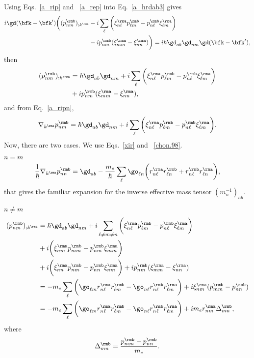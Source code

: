 Using Eqs.~\eqref{a_rip} and ~\eqref{a_rep}
into Eq.~\eqref{a_hrdab3} gives
\begin{align}\label{a_rapb}
i\gd(\bfk-\bfk')
\bigg(
(p^{\rmb}_{nm})_{;k^{\rma}}
&
-i
\sum_{\ell}
\bigg(
\xi^{\rma}_{n\ell}
p^{\rmb}_{\ell m}
-
p^{\rmb}_{n\ell}
\xi^{\rma}_{\ell m}
\bigg)
\nonumber \\
&
-i
p^{\rmb}_{nm}(\xi^{\rma}_{mm}
-
\xi^{\rma}_{nn}
)
\bigg)
=
i\hbar\gd_{ab}\gd_{nm}\gd(\bfk-\bfk')
,
\end{align}
then
\begin{align}\label{a_rapb2}
(p^{\rmb}_{nm})_{;k^{\rma}}&=
\hbar\gd_{ab}\gd_{nm}
+i
\sum_{\ell}
\bigg(
\xi^{\rma}_{n\ell}
p^{\rmb}_{\ell m}
-
p^{\rmb}_{n\ell}
\xi^{\rma}_{\ell m}
\bigg)
\nonumber \\
&+i
p^{\rmb}_{nm}(\xi^{\rma}_{mm}
-
\xi^{\rma}_{nn}
)
,
\end{align}
and from Eq.~\eqref{a_ripn},
\begin{align}\label{cogno}
\nabla_{k^{\rma}}p^{\rmb}_{nm}=
\hbar\gd_{ab}\gd_{nm}
+i
\sum_{\ell}
\bigg(
\xi^{\rma}_{n\ell}
p^{\rmb}_{\ell m}
-
p^{\rmb}_{n\ell}
\xi^{\rma}_{\ell m}
\bigg)
.
\end{align}
Now, there are two cases. We use Eqs.~\eqref{xir} and ~\eqref{chon.98}.

 $n=m$
\begin{align}\label{tita}
\frac{1}{\hbar}\nabla_{k^{\rma}}p^{\rmb}_{nn}=
\gd_{ab}
-\frac{m_e}{\hbar}
\sum_{\ell}
\go_{\ell n}
\bigg(
r^{\rma}_{n\ell}
r^{\rmb}_{\ell n}
+
r^{\rmb}_{n\ell}
r^{\rma}_{\ell n}
\bigg)
,
\end{align}
that gives the familiar expansion for the inverse effective mass
tensor $(m_n^{-1})_{ab}$.\cite{ashcroft_solid_1976}

 $n\ne m$
\begin{align}\label{mes}
(p^{\rmb}_{nm})_{;k^{\rma}}&=
\hbar\gd_{ab}\gd_{nm}
+i
\sum_{\ell\ne m\ne n}
\bigg(
\xi^{\rma}_{n\ell}
p^{\rmb}_{\ell m}
-
p^{\rmb}_{n\ell}
\xi^{\rma}_{\ell m}
\bigg)
\nonumber\\
&+
i
\bigg(
\xi^{\rma}_{nm}
p^{\rmb}_{mm}
-
p^{\rmb}_{nm}
\xi^{\rma}_{mm}
\bigg)
\nonumber\\
&+
i
\bigg(
\xi^{\rma}_{nn}
p^{\rmb}_{nm}
-
p^{\rmb}_{nn}
\xi^{\rma}_{nm}
\bigg)
+i
p^{\rmb}_{nm}(\xi^{\rma}_{mm}
-
\xi^{\rma}_{nn}
)
\nonumber \\
&=
-m_e
\sum_{\ell}
\bigg(
\go_{\ell m}
r^{\rma}_{n\ell}
r^{\rmb}_{\ell m}
-
\go_{n\ell}
r^{\rmb}_{n\ell}
r^{\rma}_{\ell m}
\bigg)
+i
\xi^{\rma}_{nm}
(p^{\rmb}_{mm}
-
p^{\rmb}_{nn}
)
\nonumber \\
&=
-m_e
\sum_{\ell}
\bigg(
\go_{\ell m} 
r^{\rma}_{n\ell} 
r^{\rmb}_{\ell m}
-
\go_{n\ell} 
r^{\rmb}_{n\ell} 
r^{\rma}_{\ell m}
\bigg)
+i 
m_er^{\rma}_{nm}
\Delta^{\rmb}_{mn}
,
\end{align} 
where
\begin{equation}\label{a_delta}
\Delta^{\rmb}_{mn}=\frac{p^{\rmb}_{mm}-p^{\rmb}_{nn}}{m_e}
.
\end{equation}

